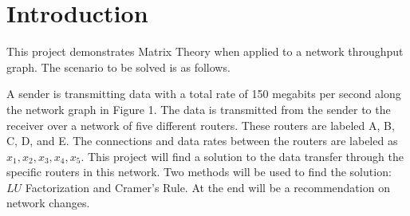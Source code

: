 \documentclass[paper.tex]{subfiles}
\begin{document}
\section{Introduction}

This project demonstrates Matrix Theory when applied to a network throughput graph.
The scenario to be solved is as follows.

A sender is transmitting data with a total rate of 150 megabits per second along the network graph in Figure 1.
The data is transmitted from the sender to the receiver over a network of five different routers.
These routers are labeled A, B, C, D, and E. The connections and data rates between the routers are labeled as $x_1, x_2, x_3, x_4, x_5$.
This project will find a solution to the data transfer through the specific routers in this network.
Two methods will be used to find the solution: $LU$ Factorization and Cramer's Rule.
At the end will be a recommendation on network changes.
\end{document}
